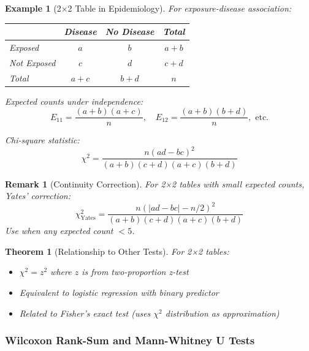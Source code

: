 \documentclass{article}
\newtheorem{theorem}{Theorem}
\newtheorem{remark}{Remark}
\newtheorem{example}{Example}
\begin{document}
\begin{example}[2×2 Table in Epidemiology]
For exposure-disease association:
\begin{center}
\begin{tabular}{|l|c|c|c|}
\hline
 & Disease & No Disease & Total \\
\hline
Exposed & $a$ & $b$ & $a+b$ \\
Not Exposed & $c$ & $d$ & $c+d$ \\
\hline
Total & $a+c$ & $b+d$ & $n$ \\
\hline
\end{tabular}
\end{center}

Expected counts under independence:
\begin{equation}
E_{11} = \frac{(a+b)(a+c)}{n}, \quad E_{12} = \frac{(a+b)(b+d)}{n}, \text{ etc.}
\end{equation}

Chi-square statistic:
\begin{equation}
\chi^2 = \frac{n(ad-bc)^2}{(a+b)(c+d)(a+c)(b+d)}
\end{equation}
\end{example}

\begin{remark}[Continuity Correction]
For 2×2 tables with small expected counts, Yates' correction:
\begin{equation}
\chi^2_{\text{Yates}} = \frac{n(|ad-bc| - n/2)^2}{(a+b)(c+d)(a+c)(b+d)}
\end{equation}
Use when any expected count $< 5$.
\end{remark}

\begin{theorem}[Relationship to Other Tests]
For 2×2 tables:
\begin{itemize}
    \item $\chi^2 = z^2$ where $z$ is from two-proportion z-test
    \item Equivalent to logistic regression with binary predictor
    \item Related to Fisher's exact test (uses $\chi^2$ distribution as approximation)
\end{itemize}
\end{theorem}

\subsubsection{Wilcoxon Rank-Sum and Mann-Whitney U Tests}
\end{document}
